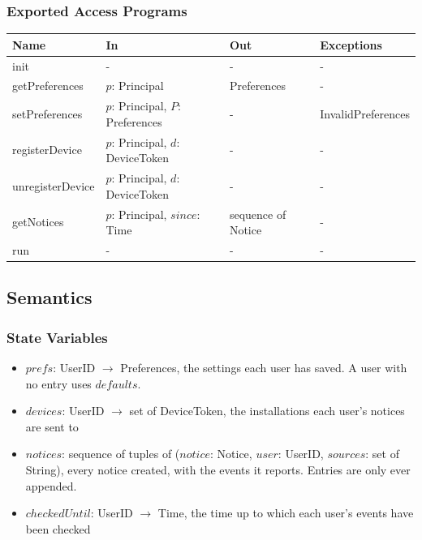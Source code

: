 \documentclass[12pt, titlepage]{article}
\begin{document}
\subsubsection{Exported Access Programs}

\begin{center}
\renewcommand{\arraystretch}{1.2}
\begin{tabular}{>{\raggedright\arraybackslash}p{3.4cm}
  >{\raggedright\arraybackslash}p{4.6cm}
  >{\raggedright\arraybackslash}p{2.8cm}
  >{\raggedright\arraybackslash}p{3.4cm}}
\toprule
\textbf{Name} & \textbf{In} & \textbf{Out} & \textbf{Exceptions} \\
\midrule
init & - & - & - \\
getPreferences & $p$: Principal & Preferences & - \\
setPreferences & $p$: Principal, $P$: Preferences & - &
  InvalidPreferences \\
registerDevice & $p$: Principal, $d$: DeviceToken & - & - \\
unregisterDevice & $p$: Principal, $d$: DeviceToken & - & - \\
getNotices & $p$: Principal, $\mathit{since}$: Time & sequence of Notice &
  - \\
run & - & - & - \\
\bottomrule
\end{tabular}
\end{center}

\subsection{Semantics}

\subsubsection{State Variables}

\begin{itemize}
\item $\mathit{prefs}$: UserID $\rightarrow$ Preferences, the settings each
  user has saved. A user with no entry uses $\mathit{defaults}$.
\item $\mathit{devices}$: UserID $\rightarrow$ set of DeviceToken, the
  installations each user's notices are sent to
\item $\mathit{notices}$: sequence of tuples of ($\mathit{notice}$: Notice,
  $\mathit{user}$: UserID, $\mathit{sources}$: set of String), every notice
  created, with the events it reports. Entries are only ever appended.
\item $\mathit{checkedUntil}$: UserID $\rightarrow$ Time, the time up to
  which each user's events have been checked
\end{itemize}
\end{document}
